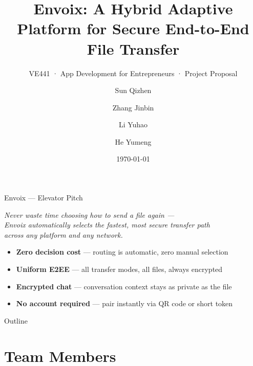 \documentclass[xcolor=table,dvipsnames,svgnames,aspectratio=169]{beamer}
\title[Envoix · Project Proposal]%
  {\textbf{Envoix}: A Hybrid Adaptive Platform for Secure End-to-End File Transfer}
\subtitle{VE441 · App Development for Entrepreneurs · Project Proposal}
\author{Sun Qizhen \and Zhang Jinbin \and Li Yuhao \and He Yumeng}
\institute[SJTU GC]{Shanghai Jiao Tong University Global College}
\date{\today}
\begin{document}
\maketitle

\begin{frame}{Envoix --- Elevator Pitch}
  \begin{block}{}
    \centering\large\itshape
    Never waste time choosing how to send a file again ---\\
    Envoix automatically selects the fastest, most secure transfer path\\
    across any platform and any network.
  \end{block}

  \vspace{1.5em}

  \begin{itemize}\setlength{\itemsep}{0.55em}
    \item \textbf{Zero decision cost} --- routing is automatic, zero manual selection
    \item \textbf{Uniform E2EE} --- all transfer modes, all files, always encrypted
    \item \textbf{Encrypted chat} --- conversation context stays as private as the file
    \item \textbf{No account required} --- pair instantly via QR code or short token
  \end{itemize}
\end{frame}

\begin{frame}{Outline}
  \tableofcontents[hideallsubsections]
\end{frame}

\AtBeginSection[]{
  \begin{frame}
    \tableofcontents[currentsection,subsectionstyle=show/show/hide]
  \end{frame}
}

\section{Team Members}
\end{document}
